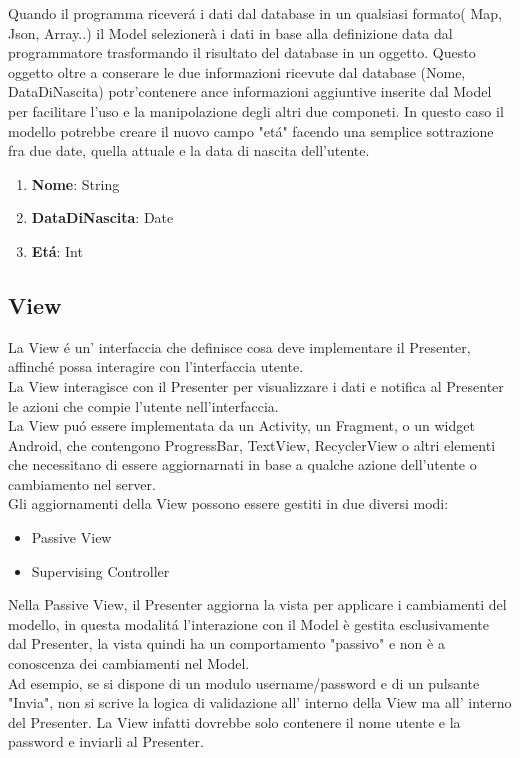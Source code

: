 Quando il programma ricever\'a i dati dal database in un qualsiasi formato( Map, Json, Array..) il Model selezionerà i dati in base alla definizione data dal programmatore trasformando il risultato del database in un oggetto.
Questo oggetto oltre a conserare le due informazioni ricevute dal database (Nome, DataDiNascita) potr'\a contenere ance informazioni aggiuntive inserite dal Model per facilitare l'uso e la manipolazione degli altri due componeti.
In questo caso il modello potrebbe creare il nuovo campo "et\'a" facendo una semplice sottrazione fra due date, quella attuale e la data di nascita dell'utente.

\begin{enumerate}
\item \textbf{Nome}: String
\item \textbf{DataDiNascita}: Date
\item \textbf{Et\'a}: Int
\end{enumerate}


\subsection{View}
La View \'e un' interfaccia che definisce cosa deve implementare il Presenter, affinch\'e possa interagire con l'interfaccia utente.\\
La View interagisce con il Presenter per visualizzare i dati e notifica al Presenter le azioni che compie l'utente nell'interfaccia.\\
La View pu\'o essere implementata da un Activity, un Fragment, o un widget Android, che contengono ProgressBar, TextView, RecyclerView o altri elementi che necessitano di essere aggiornarnati in base a qualche azione dell'utente o cambiamento nel server.\\
Gli aggiornamenti della View possono essere gestiti in due diversi modi:
\begin{itemize}
    \item Passive View
    \item Supervising Controller
\end{itemize}

Nella Passive View, il Presenter aggiorna la vista per applicare i cambiamenti del modello, in questa modalit\'a l'interazione con il Model è gestita esclusivamente dal Presenter, la vista quindi ha un comportamento "passivo" e non è a conoscenza dei cambiamenti nel Model.\\
Ad esempio, se si dispone di un modulo username/password e di un pulsante "Invia", non si scrive la logica di validazione all' interno della View ma all' interno del Presenter. La View infatti dovrebbe solo contenere il nome utente e la password e inviarli al Presenter.

